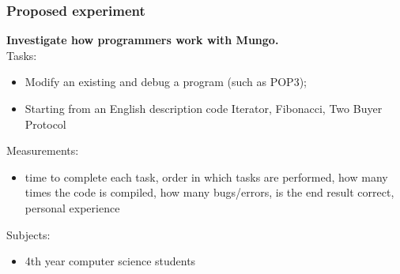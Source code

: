 \begin{frame}[fragile]\frametitle{Proposed experiment}
%
%
%
%
\textbf{Investigate how programmers work with Mungo.}\\
Tasks:
\begin{itemize}
  \item Modify an existing and debug a program (such as POP3);
  \item Starting from an English description code Iterator, Fibonacci, Two Buyer Protocol\\
\end{itemize}
Measurements:
\begin{itemize}
  \item time to complete each task, order in which tasks are performed, how many times the code is compiled, how many bugs/errors, is the end result correct, personal experience\\
\end{itemize}
Subjects:
\begin{itemize}
  \item 4th year computer science students\\
\end{itemize}
%

\end{frame}



%
%
%
%
